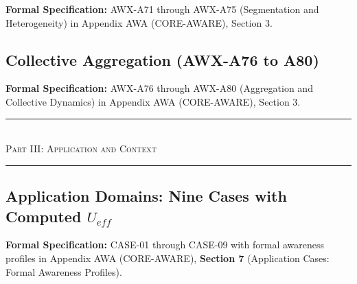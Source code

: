 \begin{cross-reference}
\textbf{Formal Specification:} AWX-A71 through AWX-A75 (Segmentation and Heterogeneity) in
Appendix AWA (CORE-AWARE), Section 3.
\end{cross-reference}

\subsection{Collective Aggregation (AWX-A76 to A80)}
\label{subsec:11-14-aggregation}



\begin{cross-reference}
\textbf{Formal Specification:} AWX-A76 through AWX-A80 (Aggregation and Collective Dynamics) in
Appendix AWA (CORE-AWARE), Section 3.
\end{cross-reference}



\begin{center}
\rule{0.8\textwidth}{0.4pt}\\[0.5em]
{\large\textsc{Part III: Application and Context}}\\[0.3em]
\rule{0.8\textwidth}{0.4pt}
\end{center}

\subsection{Application Domains: Nine Cases with Computed $U_{eff}$}
\label{subsec:11-15-applications}



\begin{cross-reference}
\textbf{Formal Specification:} CASE-01 through CASE-09 with formal awareness profiles in
Appendix AWA (CORE-AWARE), \textbf{Section 7} (Application Cases: Formal Awareness Profiles).
\end{cross-reference}

